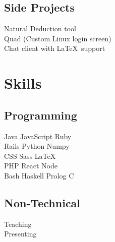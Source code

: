 \documentclass[]{deedy-resume-openfont}
\begin{document}
\begin{minipage}[t]{0.33\textwidth}
\subsection{Side Projects}
Natural Deduction tool\\
Quad (Custom Linux login screen)\\
Chat client with \LaTeX \ support\\
\sectionsep


\section{Skills}
\subsection{Programming}
Java \textbullet{} JavaScript \textbullet{} Ruby\\
Rails \textbullet{} Python \textbullet{} Numpy\\
CSS \textbullet{} Sass \textbullet{} \LaTeX\ \\
PHP \textbullet{} React  \textbullet{} Node \\
Bash \textbullet{} Haskell \textbullet{} Prolog \textbullet{} C
\sectionsep

\subsection{Non-Technical}
Teaching\\
Presenting\\
\sectionsep

%
%

\end{minipage}
\hfill
\end{document}
